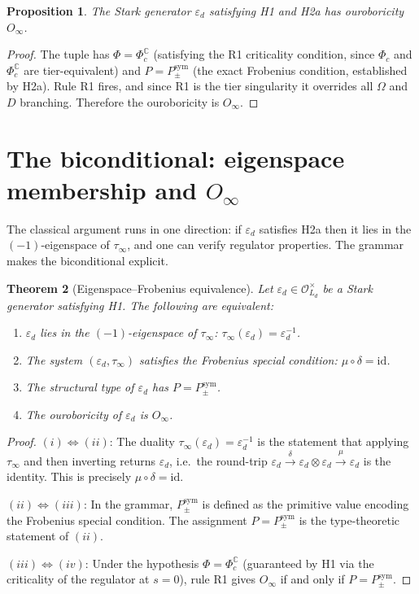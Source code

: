 \documentclass[12pt]{article}
\theoremstyle{plain}
\newtheorem{theoreminner}{Theorem}[section]
\newtheorem{propositioninner}[theoreminner]{Proposition}
\theoremstyle{definition}
\theoremstyle{remark}
\newenvironment{theorem}{\begin{mdframed}[style=thmstyle]\begin{theoreminner}}{\end{theoreminner}\end{mdframed}}
\newenvironment{proposition}{\begin{mdframed}[style=thmstyle]\begin{propositioninner}}{\end{propositioninner}\end{mdframed}}
\newcommand{\OO}{\mathcal{O}}
\newcommand{\tauinf}{\tau_\infty}
\newcommand{\epsd}{\varepsilon_d}
\begin{document}
\begin{proposition}
The Stark generator $\epsd$ satisfying H1 and H2a has ouroboricity $O_\infty$.
\end{proposition}

\begin{proof}
The tuple has $\Phi = \Phi_c^\mathbb{C}$ (satisfying the R1 criticality condition, since
$\Phi_c$ and $\Phi_c^\mathbb{C}$ are tier-equivalent) and $P = P_{\pm}^{\text{sym}}$ (the
exact Frobenius condition, established by H2a). Rule R1 fires, and since R1 is the tier
singularity it overrides all $\Omega$ and $D$ branching. Therefore the ouroboricity is
$O_\infty$.
\end{proof}

\section{The biconditional: eigenspace membership and $O_\infty$}
\label{sec:biconditional}

The classical argument runs in one direction: if $\epsd$ satisfies H2a then it lies in the
$(-1)$-eigenspace of $\tauinf$, and one can verify regulator properties. The grammar makes the
biconditional explicit.

\begin{theorem}[Eigenspace–Frobenius equivalence]
\label{thm:biconditional}
Let $\epsd \in \OO_{L_d}^\times$ be a Stark generator satisfying H1. The following are
equivalent:
\begin{enumerate}
  \item[(i)] $\epsd$ lies in the $(-1)$-eigenspace of $\tauinf$: $\tauinf(\epsd) = \epsd^{-1}$.
  \item[(ii)] The system $(\epsd, \tauinf)$ satisfies the Frobenius special condition:
    $\mu \circ \delta = \mathrm{id}$.
  \item[(iii)] The structural type of $\epsd$ has $P = P_{\pm}^{\text{sym}}$.
  \item[(iv)] The ouroboricity of $\epsd$ is $O_\infty$.
\end{enumerate}
\end{theorem}

\begin{proof}
$(i) \Leftrightarrow (ii)$: The duality $\tauinf(\epsd) = \epsd^{-1}$ is the statement that
applying $\tauinf$ and then inverting returns $\epsd$, i.e.\ the round-trip
$\epsd \xrightarrow{\delta} \epsd \otimes \epsd \xrightarrow{\mu} \epsd$ is the identity.
This is precisely $\mu \circ \delta = \mathrm{id}$.

$(ii) \Leftrightarrow (iii)$: In the grammar, $P_{\pm}^{\text{sym}}$ is defined as the
primitive value encoding the Frobenius special condition. The assignment $P = P_{\pm}^{\text{sym}}$
is the type-theoretic statement of $(ii)$.

$(iii) \Leftrightarrow (iv)$: Under the hypothesis $\Phi = \Phi_c^\mathbb{C}$ (guaranteed by
H1 via the criticality of the regulator at $s = 0$), rule R1 gives $O_\infty$ if and only if
$P = P_{\pm}^{\text{sym}}$.
\end{proof}
\end{document}
